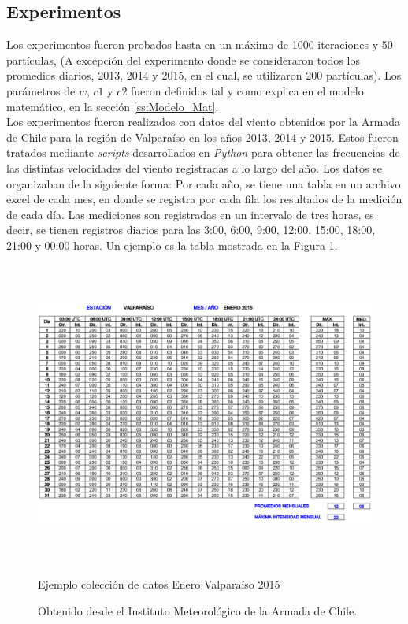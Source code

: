 \subsection{Experimentos}
Los experimentos fueron probados hasta en un máximo de 1000 iteraciones y 50 partículas, (A excepción del experimento donde se consideraron todos los promedios diarios, 2013, 2014 y 2015, en el cual, se utilizaron 200 partículas). Los parámetros de $w$, $c1$ y $c2$ fueron definidos tal y como explica en el modelo matemático, en la sección \ref{ss:Modelo_Mat}.\\
Los experimentos fueron realizados con datos del viento obtenidos por la Armada de Chile para la región de Valparaíso en los años 2013, 2014 y 2015. Estos fueron tratados mediante \emph{scripts} desarrollados en \emph{Python} para obtener las frecuencias de las distintas velocidades del viento registradas a lo largo del año. Los datos se organizaban de la siguiente forma: Por cada año, se tiene una tabla en un archivo excel de cada mes, en donde se registra por cada fila los resultados de la medición de cada día. Las mediciones son registradas en un intervalo de tres horas, es decir, se tienen registros diarios para las 3:00, 6:00, 9:00, 12:00, 15:00, 18:00, 21:00 y 00:00 horas. Un ejemplo es la tabla mostrada en la Figura \ref{fig:example_data}.\\
 \begin{figure}[h!]
    \centering
    \includegraphics[height=100mm]{figures/example_data.png}
    \caption{Ejemplo colección de datos Enero Valparaíso 2015}
    \vspace{-.25cm}
    \caption*{Obtenido desde el Instituto Meteorológico de la Armada de Chile.}
    \label{fig:example_data}
 \end{figure}

